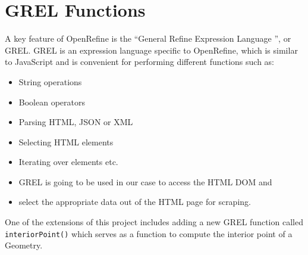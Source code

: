 \section{GREL Functions}
A key feature of OpenRefine is the \textquotedblleft General Refine Expression Language \textquotedblright, or GREL.
GREL is an expression language specific to OpenRefine, which is similar to JavaScript and is convenient for performing different functions such as:
\begin{itemize}
    \item String operations
    \item Boolean operators
    \item Parsing HTML, JSON or XML
    \item Selecting HTML elements
    \item Iterating over elements etc.
    \item GREL is going to be used in our case to access the HTML DOM and
    \item select the appropriate data out of the HTML page for scraping.
\end{itemize} \cite{OpenRefineCoreDump}
One of the extensions of this project includes adding a new GREL function called \texttt{interiorPoint()}
which serves as a function to compute the interior point of a Geometry.